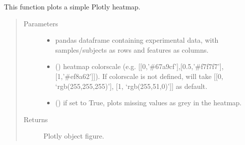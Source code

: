 \documentclass[letterpaper,10pt,english]{sphinxmanual}
\begin{document}
\begin{fulllineitems}
\label{\detokenize{_autosummary/analytics_core.viz:analytics_core.viz.wgcnaFigures.get_heatmap}}
This function plots a simple Plotly heatmap.
\begin{quote}\begin{description}
\item[{Parameters}] \leavevmode\begin{itemize}
\item {} 
 \textendash{} pandas dataframe containing experimental data, with samples/subjects as rows and features as columns.

\item {} 
 (\sphinxstyleliteralemphasis{\sphinxupquote{{[}}}\sphinxstyleliteralemphasis{\sphinxupquote{{]}}}) \textendash{} heatmap colorscale (e.g. {[}{[}0,’\#67a9cf’{]},{[}0.5,’\#f7f7f7’{]},{[}1,’\#ef8a62’{]}{]}). If colorscale is not defined, will take {[}{[}0, ‘rgb(255,255,255)’{]}, {[}1, ‘rgb(255,51,0)’{]}{]} as default.

\item {} 
 () \textendash{} if set to True, plots missing values as grey in the heatmap.

\end{itemize}

\item[{Returns}] \leavevmode
Plotly object figure.

\end{description}\end{quote}

\end{fulllineitems}

\end{document}
